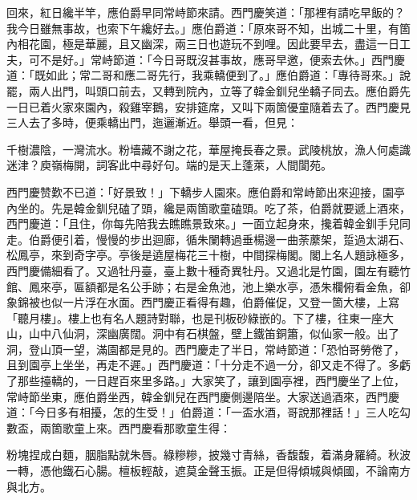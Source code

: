 回來，紅日纔半竿，應伯爵早同常峙節來請。西門慶笑道：「那裡有請吃早飯的？我今日雖無事故，也索下午纔好去。」應伯爵道：「原來哥不知，出城二十里，有箇內相花園，極是華麗，且又幽深，兩三日也遊玩不到哩。因此要早去，盡這一日工夫，可不是好。」常峙節道：「今日哥既沒甚事故，應哥早邀，便索去休。」西門慶道：「既如此；常二哥和應二哥先行，我乘轎便到了。」應伯爵道：「專待哥來。」說罷，兩人出門，叫頭口前去，又轉到院內，立等了韓金釧兒坐轎子同去。應伯爵先一日已着火家來園內，殺雞宰鵝，安排筵席，又叫下兩箇優童隨着去了。西門慶見三人去了多時，便乘轎出門，迤邐漸近。舉頭一看，但見：

\begin{myquote}
千樹濃陰，一灣流水。粉墻藏不謝之花，華屋掩長春之景。武陵桃放，漁人何處識迷津？庾嶺梅開，詞客此中尋好句。端的是天上蓬萊，人間閬苑。
\end{myquote}

西門慶赞歎不已道：「好景致！」下轎步人園來。應伯爵和常峙節出來迎接，園亭內坐的。先是韓金釧兒磕了頭，纔是兩箇歌童磕頭。吃了茶，伯爵就要遞上酒來，西門慶道：「且住，你每先陪我去瞧瞧景致來。」一面立起身來，攙着韓金釧手兒同走。伯爵便引着，慢慢的步出迴廊，循朱闌轉過垂楊邊一曲荼䕷架，踅過太湖石、松鳳亭，來到奇字亭。亭後是遶屋梅花三十樹，中間探梅閣。閣上名人題詠極多，西門慶備細看了。又過牡丹臺，臺上數十種奇異牡丹。又過北是竹園，園左有聽竹館、鳳來亭，匾額都是名公手跡；右是金魚池，池上樂水亭，憑朱欄俯看金魚，卻象錦被也似一片浮在水面。西門慶正看得有趣，伯爵催促，{}又登一箇大樓，上寫「聽月樓」。樓上也有名人題詩對聯，也是刊板砂綠嵌的。下了樓，往東一座大山，山中八仙洞，深幽廣闊。洞中有石棋盤，壁上鐵笛銅簫，似仙家一般。出了洞，登山頂一望，滿園都是見的。{}西門慶走了半日，常峙節道：「恐怕哥勞倦了，且到園亭上坐坐，再走不遲。」西門慶道：「十分走不過一分，卻又走不得了。多虧了那些擡轎的，一日趕百來里多路。」{}大家笑了，讓到園亭裡，西門慶坐了上位，常峙節坐東，應伯爵坐西，韓金釧兒在西門慶側邊陪坐。大家送過酒來，西門慶道：「今日多有相擾，怎的生受！」伯爵道：「一盃水酒，哥說那裡話！」三人吃勾數盃，兩箇歌童上來。西門慶看那歌童生得：

\begin{myquote}
粉塊捏成白麵，胭脂點就朱唇。綠糝糝，披幾寸青絲，{}香馥馥，着滿身羅綺。秋波一轉，憑他鐵石心腸。檀板輕敲，遮莫金聲玉振。正是但得傾城與傾國，不論南方與北方。
\end{myquote}

